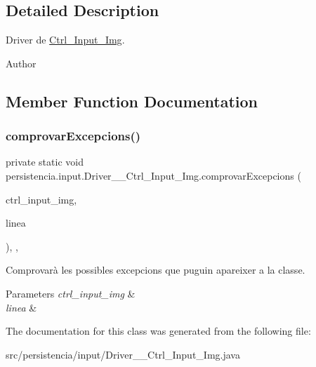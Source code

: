 \subsection{Detailed Description}
Driver de \hyperlink{classpersistencia_1_1input_1_1Ctrl__Input__Img}{Ctrl\+\_\+\+Input\+\_\+\+Img}. 

\begin{DoxyAuthor}{Author}

\end{DoxyAuthor}


\subsection{Member Function Documentation}
\mbox{\label{classpersistencia_1_1input_1_1Driver____Ctrl__Input__Img_a60b4011cee02b5c7fc213230db46d6e0}} 
\subsubsection{\texorpdfstring{comprovar\+Excepcions()}{comprovarExcepcions()}}
{\footnotesize\ttfamily private static void persistencia.\+input.\+Driver\+\_\+\+\_\+\+Ctrl\+\_\+\+Input\+\_\+\+Img.\+comprovar\+Excepcions (\begin{DoxyParamCaption}\item[{\hyperlink{classpersistencia_1_1input_1_1Ctrl__Input__Img}{Ctrl\+\_\+\+Input\+\_\+\+Img}}]{ctrl\+\_\+input\+\_\+img,  }\item[{String}]{linea }\end{DoxyParamCaption})\hspace{0.3cm}{\ttfamily [inline]}, {\ttfamily [static]}, {\ttfamily [private]}}



Comprovarà les possibles excepcions que puguin apareixer a la classe. 


\begin{DoxyParams}{Parameters}
{\em ctrl\+\_\+input\+\_\+img} & \\
\hline
{\em linea} & \\
\hline
\end{DoxyParams}


The documentation for this class was generated from the following file\+:\begin{DoxyCompactItemize}
\item 
src/persistencia/input/Driver\+\_\+\+\_\+\+Ctrl\+\_\+\+Input\+\_\+\+Img.\+java\end{DoxyCompactItemize}
